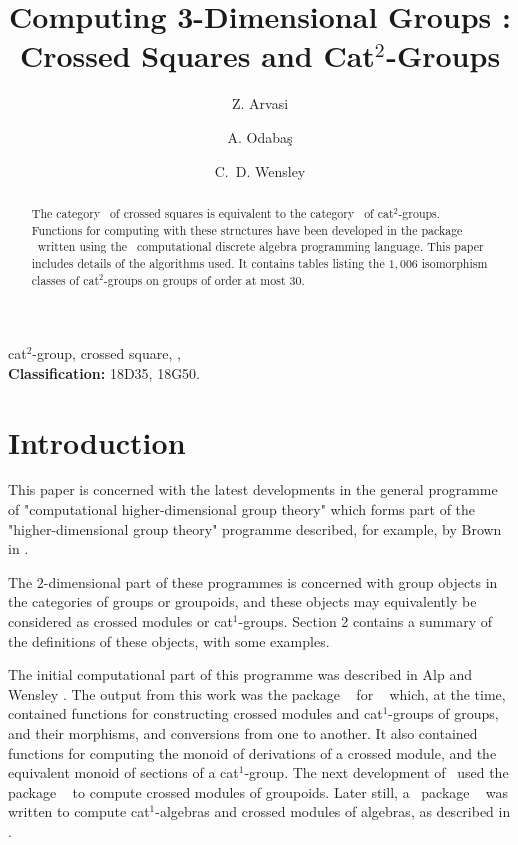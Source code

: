 \documentclass[a4paper,11pt]{article}
\theoremstyle{plain}
\theoremstyle{definition}
\begin{document}
\title{Computing 3-Dimensional Groups : Crossed Squares and  Cat$^2$-Groups}

\author[a]{Z. Arvasi}
\author[a]{A. Odaba\c{s}}
\author[b]{C.~D. Wensley}

\date{}

\maketitle

\begin{abstract}
The category \catXSq\ of crossed squares is equivalent to 
the category \catCatt\ of cat$^2$-groups. 
Functions for computing with these structures have been developed in 
the package \XMod\ written using the \GAP\ computational discrete algebra 
programming language.
This paper includes details of the algorithms used. 
It contains tables listing the $1,006$ isomorphism classes of cat$^2$-groups on groups of order at most $30$. 


\end{abstract}

 cat$^2$-group, crossed square, \GAP, \XMod\ 
\\ {\bf Classification:} 18D35, 18G50.

\section{Introduction}

This paper is concerned with the latest developments in the general programme 
of "computational higher-dimensional group theory" which forms part of the 
"higher-dimensional group theory" programme described, for example, 
by Brown in \cite{brown-lms}. 

The $2$-dimensional part of these programmes is concerned with group objects 
in the categories of groups or groupoids, and these objects may equivalently 
be considered as crossed modules or cat$^1$-groups. 
Section 2 contains a summary of the definitions of these objects, 
with some examples. 

The initial computational part of this programme was described in 
Alp and Wensley \cite{alp-wensley-ijac}. 
The output from this work was the package \XMod\ \cite{xmod} 
for \GAP\ \cite{gap} which, at the time, 
contained functions for constructing crossed modules and cat$^1$-groups of groups, and their morphisms, and conversions from one to another. 
It also contained functions for computing the monoid of derivations of a 
crossed module, and the equivalent monoid of sections of a cat$^1$-group. 
The next development of \XMod\ used the package \groupoids\ 
\cite{groupoids} to compute crossed modules of groupoids. 
Later still, a \GAP\ package \XModAlg\ \cite{xmodalg} 
was written to compute cat$^1$-algebras and crossed modules of algebras, 
as described in \cite{arvasi-odabas}. 
\end{document}

